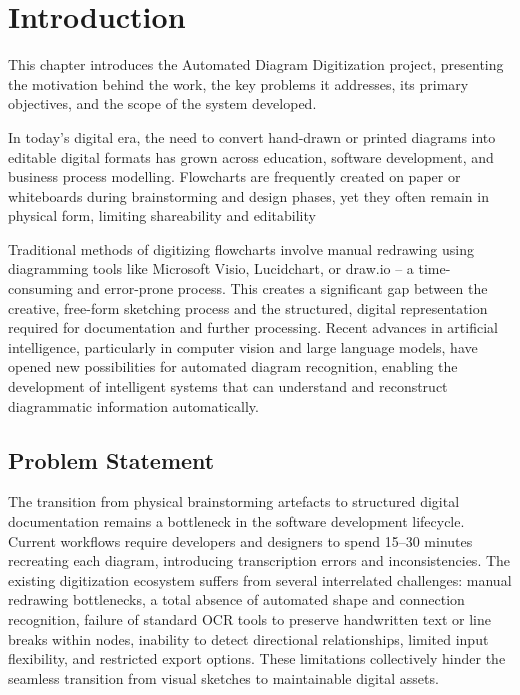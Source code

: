 
\chapter{Introduction}
\label{ch:introduction}
 
This chapter introduces the Automated Diagram Digitization project, 
presenting the motivation behind the work, the key problems it 
addresses, its primary objectives, and the scope of the system 
developed.

In today's digital era, the need to convert hand-drawn or printed diagrams into editable digital formats has grown across education, software development, and business process modelling. Flowcharts are frequently created on paper or whiteboards during brainstorming and design phases, yet they often remain in physical form, limiting shareability and editability

Traditional methods of digitizing flowcharts involve manual redrawing 
using diagramming tools like Microsoft Visio, Lucidchart, or draw.io 
-- a time-consuming and error-prone process. This creates a 
significant gap between the creative, free-form sketching process and 
the structured, digital representation required for documentation and 
further processing. Recent advances in artificial intelligence, 
particularly in computer vision and large language models, have opened 
new possibilities for automated diagram recognition, enabling the 
development of intelligent systems that can understand and reconstruct 
diagrammatic information automatically.
 
\section{Problem Statement}
 
The transition from physical brainstorming artefacts to structured digital documentation remains a bottleneck in the software development lifecycle. Current workflows require developers and designers to spend 15–30 minutes recreating each diagram, introducing transcription errors and inconsistencies. The existing digitization ecosystem suffers from several interrelated challenges: manual redrawing bottlenecks, a total absence of automated shape and connection recognition, failure of standard OCR tools to preserve handwritten text or line breaks within nodes, inability to detect directional relationships, limited input flexibility, and restricted export options. These limitations collectively hinder the seamless transition from visual sketches to maintainable digital assets.
 
